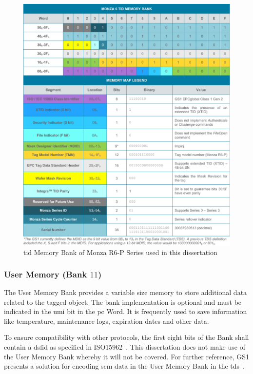 \begin{figure}[!ht]
    \centering
    \includegraphics[width=\textwidth]{./figs/02-state-of-the-art/tid.pdf}
    \caption{\ac{tid} Memory Bank of Monza R6-P Series used in this dissertation~\cite{TIDMemoryMaps}} 
    \label{fig:tid}
\end{figure}

\subsubsection{User Memory (Bank $11$)}

The User Memory Bank provides a variable size memory to store additional data related to the tagged object.
The bank implementation is optional and must be indicated in the \ac{umi} bit in the \ac{pc} Word.
It is frequently used to save information like temperature, maintenance logs, expiration dates and other data.

To ensure compatibility with other protocols, the first eight bits of the Bank shall contain a \ac{dsfid} as specified in ISO15962~\cite{isoISOIEC15962}.
This dissertation does not make use of the User Memory Bank whereby it will not be covered.
For further reference, GS1 presents a solution for encoding \ac{scm} data in the User Memory Bank in the \ac{tds}~\cite{GS1EPCTDS}.

